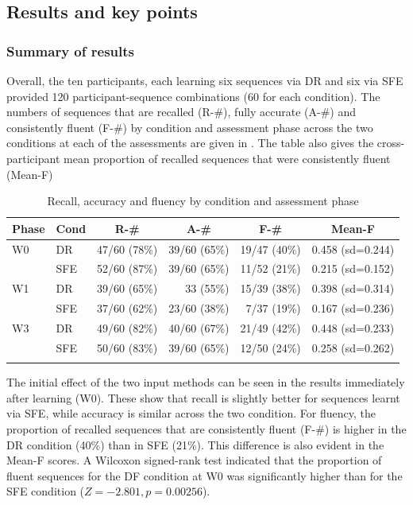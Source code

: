 \documentclass[output=paper]{langscibook}
\begin{document}
\subsection{Results and key points}
\subsubsection{Summary of results}


Overall, the ten participants, each learning six sequences via DR and six via SFE provided 120 participant-sequence combinations (60 for each condition). The numbers of sequences that are recalled (R-\#), fully accurate (A-\#) and consistently fluent (F-\#) by condition and assessment phase across the two conditions at each of the assessments are given in .  The table also gives the cross-participant mean proportion of recalled sequences that were consistently fluent (Mean-F)

\begin{table}
\begin{tabular}{llrrrc}
\lsptoprule
Phase & Cond & \multicolumn{1}{c}{R-\#} & \multicolumn{1}{c}{A-\#} & \multicolumn{1}{c}{F-\#} & Mean-F\\\midrule
W0  & {DR}  & {47/60 (78\%)} & {39/60 (65\%)} & {19/47 (40\%)} & {0.458 (sd=0.244)}\\
    & {SFE}  & {52/60 (87\%)} & {39/60 (65\%)} & {11/52 (21\%)} & {0.215 (sd=0.152)}\\
W1  & {DR}  & {39/60 (65\%)} & {33 (55\%)} & {15/39 (38\%)} & {0.398 (sd=0.314)}\\
    & {SFE}  & {37/60 (62\%)} & {23/60 (38\%)} & { 7/37 (19\%)} & {0.167 (sd=0.236)}\\
W3  & {DR} & {49/60 (82\%)} & {40/60 (67\%)} & {21/49 (42\%)} & {0.448 (sd=0.233)}\\
    & {SFE}  & {50/60 (83\%)} & {39/60 (65\%)} & {12/50 (24\%)} & {0.258 (sd=0.262)}\\
\lspbottomrule
\end{tabular}
\caption{Recall, accuracy and fluency by condition and assessment phase\label{tab:cutler:3}}
\end{table}


The initial effect of the two input methods can be seen in the results immediately after learning (W0). These show that recall is slightly better for sequences learnt via SFE, while accuracy is similar across the two condition. For fluency, the proportion of recalled sequences that are consistently fluent (F-\#) is higher in the DR condition (40\%) than in SFE (21\%). This difference is also evident in the Mean-F scores.  A Wilcoxon signed-rank test indicated that the proportion of fluent sequences for the DF condition at W0 was significantly higher than for the SFE condition ($Z=-2.801, p=0.00256$).
\end{document}
